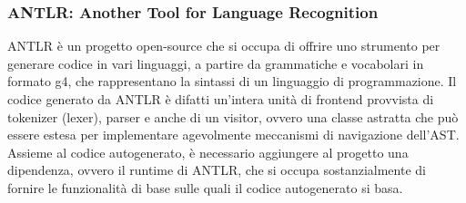 \subsubsection{ANTLR: Another Tool for Language Recognition}
ANTLR è un progetto open-source che si occupa di offrire uno strumento per generare codice in vari linguaggi,
a partire da grammatiche e vocabolari in formato g4, che rappresentano la sintassi di un linguaggio di programmazione.
Il codice generato da ANTLR è difatti un'intera unità di frontend provvista di tokenizer (lexer), parser e anche 
di un visitor, ovvero una classe astratta che può essere estesa per implementare agevolmente meccanismi di 
navigazione dell'AST. \\ 

Assieme al codice autogenerato, è necessario aggiungere al progetto una dipendenza, ovvero il runtime di ANTLR,
che si occupa sostanzialmente di fornire le funzionalità di base sulle quali il codice autogenerato si basa. \\